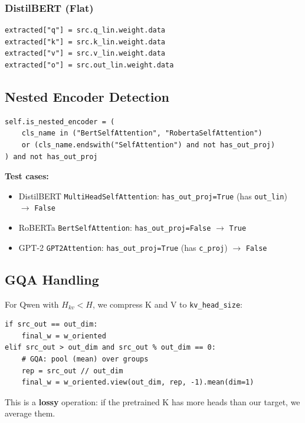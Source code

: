 \subsubsection{DistilBERT (Flat)}

\begin{lstlisting}
extracted["q"] = src.q_lin.weight.data
extracted["k"] = src.k_lin.weight.data
extracted["v"] = src.v_lin.weight.data
extracted["o"] = src.out_lin.weight.data
\end{lstlisting}

\subsection{Nested Encoder Detection}

\begin{lstlisting}
self.is_nested_encoder = (
    cls_name in ("BertSelfAttention", "RobertaSelfAttention")
    or (cls_name.endswith("SelfAttention") and not has_out_proj)
) and not has_out_proj
\end{lstlisting}

\textbf{Test cases:}
\begin{itemize}
\item DistilBERT \texttt{MultiHeadSelfAttention}: \texttt{has\_out\_proj=True} (has \texttt{out\_lin}) $\to$ \texttt{False}
\item RoBERTa \texttt{BertSelfAttention}: \texttt{has\_out\_proj=False} $\to$ \texttt{True}
\item GPT-2 \texttt{GPT2Attention}: \texttt{has\_out\_proj=True} (has \texttt{c\_proj}) $\to$ \texttt{False}

\end{itemize}
\subsection{GQA Handling}

For Qwen with $H_{kv} < H$, we compress K and V to \texttt{kv\_head\_size}:

\begin{lstlisting}
if src_out == out_dim:
    final_w = w_oriented
elif src_out > out_dim and src_out % out_dim == 0:
    # GQA: pool (mean) over groups
    rep = src_out // out_dim
    final_w = w_oriented.view(out_dim, rep, -1).mean(dim=1)
\end{lstlisting}

This is a \textbf{lossy} operation: if the pretrained K has more heads than our 
target, we average them.

